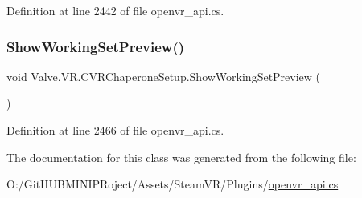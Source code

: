 Definition at line 2442 of file openvr\+\_\+api.\+cs.

\mbox{\label{class_valve_1_1_v_r_1_1_c_v_r_chaperone_setup_a2bc2d7e52176af8cf8cef21fc309c46e}} 
\subsubsection{\texorpdfstring{ShowWorkingSetPreview()}{ShowWorkingSetPreview()}}
{\footnotesize\ttfamily void Valve.\+V\+R.\+C\+V\+R\+Chaperone\+Setup.\+Show\+Working\+Set\+Preview (\begin{DoxyParamCaption}{ }\end{DoxyParamCaption})}



Definition at line 2466 of file openvr\+\_\+api.\+cs.



The documentation for this class was generated from the following file\+:\begin{DoxyCompactItemize}
\item 
O\+:/\+Git\+H\+U\+B\+M\+I\+N\+I\+P\+Roject/\+Assets/\+Steam\+V\+R/\+Plugins/\mbox{\hyperlink{openvr__api_8cs}{openvr\+\_\+api.\+cs}}\end{DoxyCompactItemize}
